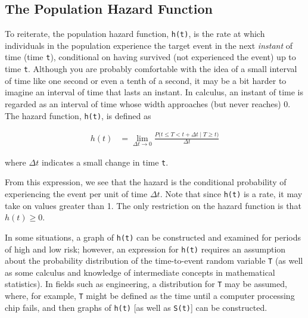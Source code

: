 \documentclass[
]{report}
\begin{document}
\hypertarget{the-population-hazard-function}{%
\subsection*{The Population Hazard Function}\label{the-population-hazard-function}}

To reiterate, the population hazard function, \texttt{h(t)}, is the rate at which individuals in the population experience the target event in the next \emph{instant} of time (time \texttt{t}), conditional on having survived (not experienced the event) up to time \texttt{t}. Although you are probably comfortable with the idea of a small interval of time like one second or even a tenth of a second, it may be a bit harder to imagine an interval of time that lasts an instant. In calculus, an instant of time is regarded as an interval of time whose width approaches (but never reaches) 0. The hazard function, \texttt{h(t)}, is defined as

\begin{align}\label{9.13}
h(t) &= \lim_{\Delta t \to 0} \frac{P\bigl(t \le T < t + \Delta t \mid T \ge t\bigr)}{\Delta t}
\tag{7.13}
\end{align}

where \(\Delta t\) indicates a small change in time \texttt{t}.

From this expression, we see that the hazard is the conditional probability of experiencing the event per unit of time \(\Delta t\). Note that since \texttt{h(t)} is a rate, it may take on values greater than 1. The only restriction on the hazard function is that \(h(t) \ge 0\).

In some situations, a graph of \texttt{h(t)} can be constructed and examined for periods of high and low risk; however, an expression for \texttt{h(t)} requires an assumption about the probability distribution of the time-to-event random variable \texttt{T} (as well as some calculus and knowledge of intermediate concepts in mathematical statistics). In fields such as engineering, a distribution for \texttt{T} may be assumed, where, for example, \texttt{T} might be defined as the time until a computer processing chip fails, and then graphs of \texttt{h(t)} {[}as well as \texttt{S(t)}{]} can be constructed.
\end{document}
